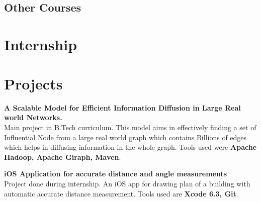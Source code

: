 \documentclass[11pt,a4paper,sans]{moderncv} %
\begin{document}
~\\

\subsection{Other Courses}




\section{Internship}



\section{Projects}

\cvlistitem
{\textbf{A Scalable Model for Efficient Information Diffusion in Large Real world Networks.}
  \\Main project in B.Tech curriculum. This model aims in effectively finding a set of Influential Node from a large real world graph which contains Billions of edges which helps in diffusing information in the whole graph. Tools used were \textbf{Apache Hadoop, Apache Giraph, Maven}. \\}

\cvlistitem
{\textbf{iOS Application for accurate distance and angle measurements}
  \\Project done during internship. An iOS app for drawing plan of a building with automatic accurate distance measurement. Tools used are \textbf{Xcode 6.3, Git}. \\}
\end{document}
